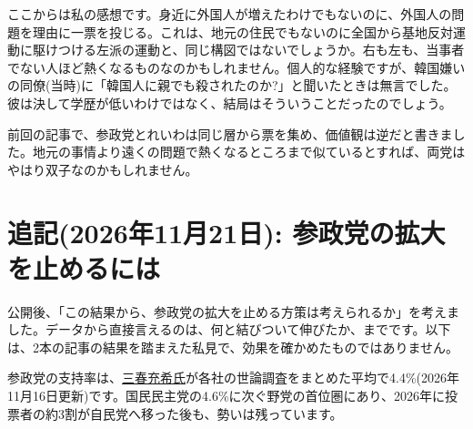 \documentclass[a4paper,11pt]{ltjsarticle}
\begin{document}
ここからは私の感想です。身近に外国人が増えたわけでもないのに、外国人の問題を理由に一票を投じる。これは、地元の住民でもないのに全国から基地反対運動に駆けつける左派の運動と、同じ構図ではないでしょうか。右も左も、当事者でない人ほど熱くなるものなのかもしれません。個人的な経験ですが、韓国嫌いの同僚(当時)に「韓国人に親でも殺されたのか?」と聞いたときは無言でした。彼は決して学歴が低いわけではなく、結局はそういうことだったのでしょう。

前回の記事で、参政党とれいわは同じ層から票を集め、価値観は逆だと書きました。地元の事情より遠くの問題で熱くなるところまで似ているとすれば、両党はやはり双子なのかもしれません。

\section*{追記(2026年11月21日): 参政党の拡大を止めるには}

公開後、「この結果から、参政党の拡大を止める方策は考えられるか」を考えました。データから直接言えるのは、何と結びついて伸びたか、までです。以下は、2本の記事の結果を踏まえた私見で、効果を確かめたものではありません。

参政党の支持率は、\href{https://note.com/miraisyakai/n/nf05620cd5f69}{三春充希氏}が各社の世論調査をまとめた平均で4.4\%(2026年11月16日更新)です。国民民主党の4.6\%に次ぐ野党の首位圏にあり、2026年に投票者の約3割が自民党へ移った後も、勢いは残っています。
\end{document}

